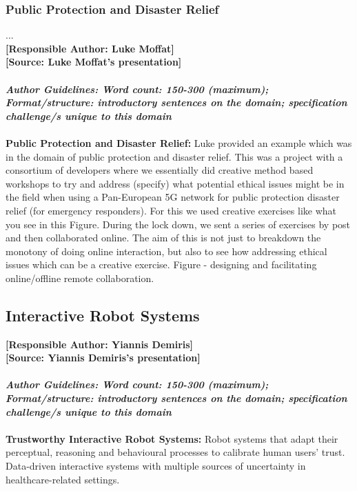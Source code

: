 \documentclass[sigconf]{acmart}
\begin{document}
\subsubsection{Public Protection and Disaster Relief}...\\
\noindent\textbf{[Responsible Author:  Luke Moffat]}\\
\noindent\textbf{[Source: Luke Moffat's presentation]}\\\\
\noindent\textbf{\textit{Author Guidelines: Word count: 150-300 (maximum); \\Format/structure: introductory sentences on the domain; specification challenge/s unique to this domain}}\\\\
\textbf{Public Protection and Disaster Relief:} Luke provided an example which was in the domain of public protection and disaster relief. 
This was a project with a consortium of developers where we essentially did creative method based workshops to try and address (specify) what potential ethical issues might be in the field when using a Pan-European 5G network for public protection disaster relief (for emergency responders). For this we used creative exercises like what you see in this Figure. 
During the lock down, we sent a series of exercises by post and then collaborated online. 
The aim of this is not just to breakdown the monotony of doing online interaction, but also to see how addressing ethical issues which can be a creative exercise. Figure - designing and facilitating online/offline remote collaboration. 

\subsection{Interactive Robot Systems}
\textbf{[Responsible Author:  Yiannis Demiris]}\\
\noindent\textbf{[Source: Yiannis Demiris's presentation]}\\\\
\noindent\textbf{\textit{Author Guidelines: Word count: 150-300 (maximum); \\Format/structure: introductory sentences on the domain; specification challenge/s unique to this domain}}\\\\ 
\textbf{Trustworthy Interactive Robot Systems:} Robot systems that adapt their perceptual, reasoning and behavioural processes to calibrate human users' trust. Data-driven interactive systems with multiple sources of uncertainty in healthcare-related settings.
\end{document}
